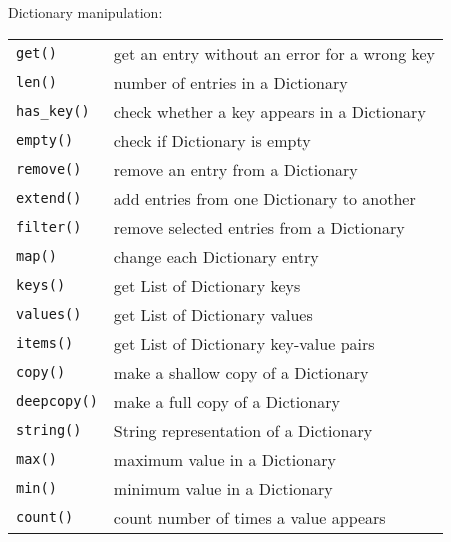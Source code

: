 Dictionary manipulation:
\label{dict-functions}
\begin{center} \begin{tabular}{l l}
				\texttt{get()} & get an entry without an error for a wrong key \\
				\texttt{len()} & number of entries in a Dictionary \\
				\texttt{has\_key()} & check whether a key appears in a Dictionary \\
				\texttt{empty()} & check if Dictionary is empty \\
				\texttt{remove()} & remove an entry from a Dictionary \\
				\texttt{extend()} & add entries from one Dictionary to another \\
				\texttt{filter()} & remove selected entries from a Dictionary \\
				\texttt{map()} & change each Dictionary entry \\
				\texttt{keys()} & get List of Dictionary keys \\
				\texttt{values()} & get List of Dictionary values \\
				\texttt{items()} & get List of Dictionary key-value pairs \\
				\texttt{copy()} & make a shallow copy of a Dictionary \\
				\texttt{deepcopy()} & make a full copy of a Dictionary \\
				\texttt{string()} & String representation of a Dictionary \\
				\texttt{max()} & maximum value in a Dictionary \\
				\texttt{min()} & minimum value in a Dictionary \\
				\texttt{count()} & count number of times a value appears \\
\end{tabular} \end{center}


